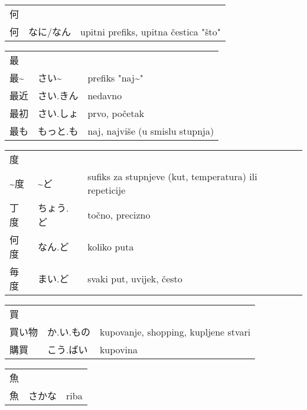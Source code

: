 

\newenvironment{dictentry}[1]{
	\begin{tabular}{p{2cm} p{3cm} p{10cm}}
		#1 &&\\
}{
	\end{tabular}
	\vspace{20pt}
}

\newcommand{\example}[3]{
	\hspace*{\fill}#1 & #2 & #3\\
}

\author{ロボット君}


\begin{dictentry}{何}
\example{何}{なに/なん}{upitni prefiks, upitna čestica "što"}
\end{dictentry}

\begin{dictentry}{最}
\example{最\textasciitilde }{さい\textasciitilde }{prefiks "naj\textasciitilde "}
\example{最近}{さい.きん}{nedavno}
\example{最初}{さい.しょ}{prvo, početak}
\example{最も}{もっと.も}{naj, najviše (u smislu stupnja)}
\end{dictentry}

\begin{dictentry}{度}
\example{\textasciitilde 度}{\textasciitilde ど}{sufiks za stupnjeve (kut, temperatura) ili repeticije}
\example{丁度}{ちょう.ど}{točno, precizno}
\example{何度}{なん.ど}{koliko puta}
\example{毎度}{まい.ど}{svaki put, uvijek, često}
\end{dictentry}

\begin{dictentry}{買}
\example{買い物}{か.い.もの}{kupovanje, shopping, kupljene stvari}
\example{購買}{こう.ばい}{kupovina}
\end{dictentry}

\begin{dictentry}{魚}
\example{魚}{さかな}{riba}
\end{dictentry}

